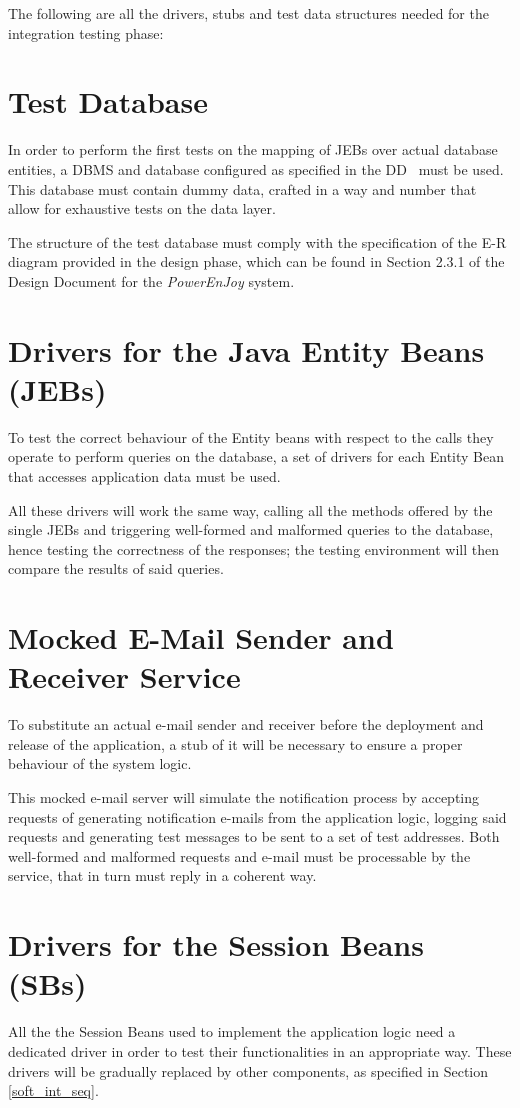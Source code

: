 The following are all the drivers, stubs and test data structures needed for the integration testing phase:

\section{Test Database}
In order to perform the first tests on the mapping of JEBs over actual database entities, a DBMS and database configured as specified in the DD~\cite{dd} must be used. This database must contain dummy data, crafted in a way and number that allow for exhaustive tests on the data layer.

The structure of the test database must comply with the specification of the E-R diagram provided in the design phase, which can be found in Section 2.3.1 of the Design Document for the \textit{PowerEnJoy} system.

\section{Drivers for the Java Entity Beans (JEBs)}
To test the correct behaviour of the Entity beans with respect to the calls they operate to perform queries on the database, a set of drivers for each Entity Bean that accesses application data must be used.

All these drivers will work the same way, calling all the methods offered by the single JEBs and triggering well-formed and malformed queries to the database, hence testing the correctness of the responses; the testing environment will then compare the results of said queries.

\section{Mocked E-Mail Sender and Receiver Service}\label{mock_email}
To substitute an actual e-mail sender and receiver before the deployment and release of the application, a stub of it will be necessary to ensure a proper behaviour of the system logic.

This mocked e-mail server will simulate the notification process by accepting requests of generating notification e-mails from the application logic, logging said requests and generating test messages to be sent to a set of test addresses. Both well-formed and malformed requests and e-mail must be processable by the service, that in turn must reply in a coherent way.

\section{Drivers for the Session Beans (SBs)}
All the the Session Beans used to implement the application logic need a dedicated driver in order to test their functionalities in an appropriate way. These drivers will be gradually replaced by other components, as specified in Section \ref{soft_int_seq}.

